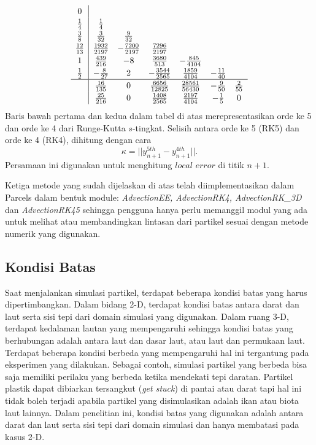 \begin{spacing}{1.5}
	\[
	\renewcommand\arraystretch{1.2}
	\begin{array}
		{c|cccccc}
		0\\
		\frac{1}{4} & \frac{1}{4}\\
		\frac{3}{8} &\frac{3}{32} &\frac{9}{32} \\
		\frac{12}{13} &\frac{1932}{2197} & -\frac{7200}{2197} & \frac{7296}{2197}\\
		1 &\frac{439}{216} & -8 & \frac{3680}{513} & -\frac{845}{4104}\\
		\frac{1}{2} &-\frac{8}{27} & 2 & -\frac{3544}{2565} & \frac{1859}{4104} & -\frac{11}{40}\\
		\hline
		& \frac{16}{135} &0 &\frac{6656}{12825} &\frac{28561}{56430} & -\frac{9}{50} & \frac{2}{55} \\
		& \frac{25}{216} &0 &\frac{1408}{2565} &\frac{2197}{4104} & -\frac{1}{5} & 0
	\end{array}
	\]
	Baris bawah pertama dan kedua dalam tabel di atas merepresentasikan orde ke 5 dan orde ke 4 dari Runge-Kutta $s$-tingkat. Selisih antara orde ke 5 (RK5) dan orde ke 4 (RK4), dihitung dengan cara
	\begin{equation*}
		\kappa = || y_{n+1}^{5th}-y_{n+1}^{4th} ||.
	\end{equation*}
	Persamaan ini digunakan untuk menghitung $\textit{local error}$ di titik $n+1$.
	\par Ketiga metode yang sudah dijelaskan di atas telah diimplementasikan dalam Parcels dalam bentuk module: \textit{AdvectionEE,\; AdvectionRK4,\; AdvectionRK\_3D} dan \textit{AdvectionRK45} sehingga pengguna hanya perlu memanggil modul yang ada untuk melihat atau membandingkan lintasan dari partikel sesuai dengan metode numerik yang digunakan.
\subsection[Kondisi Batas]{Kondisi Batas}
	Saat menjalankan simulasi partikel, terdapat beberapa kondisi batas yang harus dipertimbangkan. Dalam bidang 2-D, terdapat kondisi batas antara darat dan laut serta sisi tepi dari domain simulasi yang digunakan. Dalam ruang 3-D, terdapat kedalaman lautan yang mempengaruhi sehingga kondisi batas yang berhubungan adalah antara laut dan dasar laut, atau laut dan permukaan laut. Terdapat beberapa kondisi berbeda yang mempengaruhi hal ini tergantung pada eksperimen yang dilakukan. Sebagai contoh, simulasi partikel yang berbeda bisa saja memiliki perilaku yang berbeda ketika mendekati tepi daratan. Partikel plastik dapat dibiarkan tersangkut (\textit{get stuck}) di pantai atau darat tapi hal ini tidak boleh terjadi apabila partikel yang disimulasikan adalah ikan atau biota laut lainnya. Dalam penelitian ini, kondisi batas yang digunakan adalah antara darat dan laut serta sisi tepi dari domain simulasi dan hanya membatasi pada kasus 2-D. 
\end{spacing}
\vspace{-0.3cm}
